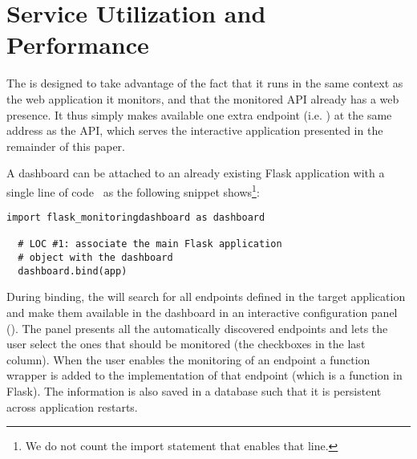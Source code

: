 

  \newpage
  \section{Service Utilization and Performance}
  \label{sec:utilandperf}


  The \tool is designed to take advantage of the fact that it runs in the same context as the web application it monitors, and that the monitored API already has a web presence. It thus simply makes available one extra endpoint (i.e. ) at the same address as the API, which serves the interactive application presented in the remainder of this paper. 

  A dashboard can be attached to an already existing Flask application with a single line of code~\cite{vogel2017low} as the following snippet shows\footnote{We do not count the import statement that enables that line.}:


  \begin{lstlisting}[style=custompython]
  import flask_monitoringdashboard as dashboard

  # LOC #1: associate the main Flask application 
  # object with the dashboard
  dashboard.bind(app) 

  \end{lstlisting}

  During binding, the \tool will search for all endpoints defined in the target application and make them available in the dashboard in an interactive configuration panel (). The panel presents all the automatically discovered endpoints and lets the user select the ones that should be monitored (the checkboxes in the last column). When the user enables the monitoring of an endpoint a function wrapper is added to the implementation of that endpoint (which is a function in Flask). The information is also saved in a database such that it is persistent across application restarts. 



